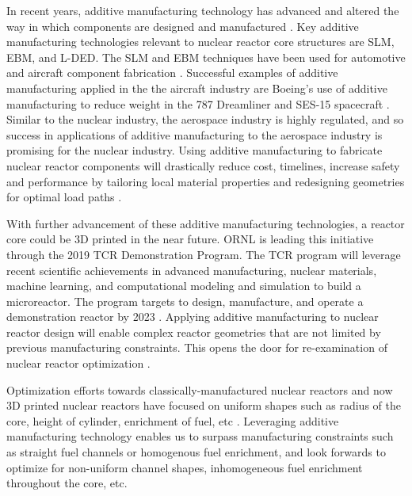 In recent years, additive manufacturing technology has advanced and  
altered the way in which components are designed and manufactured 
\cite{simpson_considerations_2019}. 
Key additive manufacturing technologies relevant to nuclear reactor core 
structures are \gls{SLM}, \gls{EBM}, and \gls{L-DED}. 
The \gls{SLM} and \gls{EBM} techniques have been used for automotive and aircraft component 
fabrication \cite{murr_frontiers_2016}.  
Successful examples of additive manufacturing applied in the the aircraft industry 
are Boeing’s use of additive manufacturing to reduce weight in the 787 Dreamliner
\cite{noauthor_printed_2017} and SES-15 spacecraft \cite{noauthor_boeing_nodate}. 
Similar to the nuclear industry, the aerospace industry is highly regulated, and 
so success in applications of additive manufacturing to the aerospace industry 
is promising for the nuclear industry.  
Using additive manufacturing to fabricate nuclear reactor components will 
drastically reduce cost, timelines, increase safety and performance by 
tailoring local material properties and redesigning geometries for optimal load paths 
\cite{simpson_considerations_2019}. 

With further advancement of these additive manufacturing technologies, a reactor 
core could be 3D printed in the near future. 
\gls{ORNL} is leading this initiative through the 2019 \gls{TCR} Demonstration 
Program. 
The \gls{TCR} program will leverage recent scientific achievements in advanced 
manufacturing, nuclear materials, machine learning, and computational modeling 
and simulation to build a microreactor. 
The program targets to design, manufacture, and operate a demonstration reactor 
by 2023 \cite{terrani_transformational_2019}. 
Applying additive manufacturing to nuclear reactor design will enable complex 
reactor geometries that are not limited by previous manufacturing constraints. 
This opens the door for re-examination of nuclear reactor optimization 
\cite{sobes_artificial_2020}. 

Optimization efforts towards classically-manufactured nuclear reactors and now
3D printed nuclear reactors have focused on uniform shapes such as radius of the 
core, height of cylinder, enrichment of fuel, etc 
\cite{sobes_artificial_2020,sacco_two_2006,kumar_new_2015,pereira_parallel_2008}. 
Leveraging additive manufacturing technology enables us to surpass manufacturing 
constraints such as straight fuel channels or homogenous fuel enrichment, 
and look forwards to optimize for non-uniform channel shapes, inhomogeneous 
fuel enrichment throughout the core, etc. 

